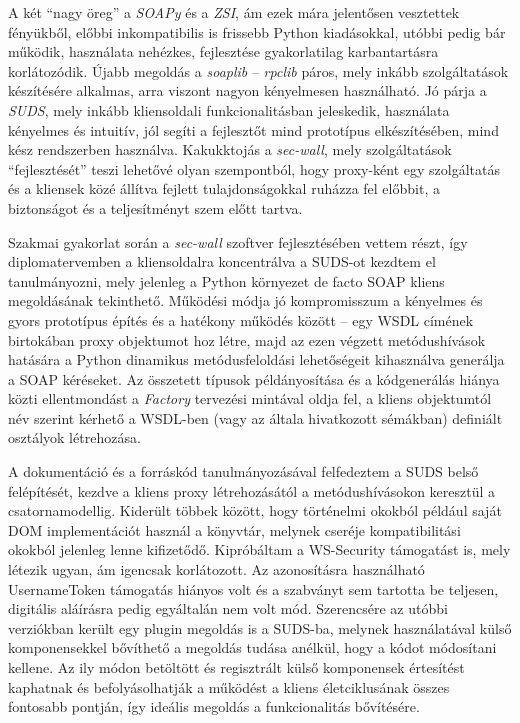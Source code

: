 A két ``nagy öreg'' a \emph{SOAPy} és a \emph{ZSI}, ám ezek mára jelentősen vesztettek fényükből, előbbi inkompatibilis is frissebb Python kiadásokkal, utóbbi pedig bár működik, használata nehézkes, fejlesztése gyakorlatilag karbantartásra korlátozódik. Újabb megoldás a \emph{soaplib} -- \emph{rpclib} páros, mely inkább szolgáltatások készítésére alkalmas, arra viszont nagyon kényelmesen használható. Jó párja a \emph{SUDS}, mely inkább kliensoldali funkcionalitásban jeleskedik, használata kényelmes és intuitív, jól segíti a fejlesztőt mind prototípus elkészítésében, mind kész rendszerben használva. Kakukktojás a \emph{sec-wall}, mely szolgáltatások ``fejlesztését'' teszi lehetővé olyan szempontból, hogy proxy-ként egy szolgáltatás és a kliensek közé állítva fejlett tulajdonságokkal ruházza fel előbbit, a biztonságot és a teljesítményt szem előtt tartva.

\bigskip

Szakmai gyakorlat során a \emph{sec-wall} szoftver fejlesztésében vettem részt, így diplomatervemben a kliensoldalra koncentrálva a SUDS-ot kezdtem el tanulmányozni, mely jelenleg a Python környezet de facto SOAP kliens megoldásának tekinthető. Működési módja jó kompromisszum a kényelmes és gyors prototípus építés és a hatékony működés között -- egy WSDL címének birtokában proxy objektumot hoz létre, majd az ezen végzett metódushívások hatására a Python dinamikus metódusfeloldási lehetőségeit kihasználva generálja a SOAP kéréseket. Az összetett típusok példányosítása és a kódgenerálás hiánya közti ellentmondást a \emph{Factory} tervezési mintával oldja fel, a kliens objektumtól név szerint kérhető a WSDL-ben (vagy az általa hivatkozott sémákban) definiált osztályok létrehozása.

A dokumentáció és a forráskód tanulmányozásával felfedeztem a SUDS belső felépítését, kezdve a kliens proxy létrehozásától a metódushívásokon keresztül a csatornamodellig. Kiderült többek között, hogy történelmi okokból például saját DOM implementációt használ a könyvtár, melynek cseréje kompatibilitási okokból jelenleg lenne kifizetődő. Kipróbáltam a WS\hyp{}Security támogatást is, mely létezik ugyan, ám igencsak korlátozott. Az azonosításra használható UsernameToken támogatás hiányos volt és a szabványt sem tartotta be teljesen, digitális aláírásra pedig egyáltalán nem volt mód. Szerencsére az utóbbi verziókban került egy plugin megoldás is a SUDS-ba, melynek használatával külső komponensekkel bővíthető a megoldás tudása anélkül, hogy a kódot módosítani kellene. Az ily módon betöltött és regisztrált külső komponensek értesítést kaphatnak és befolyásolhatják a működést a kliens életciklusának összes fontosabb pontján, így ideális megoldás a funkcionalitás bővítésére.

